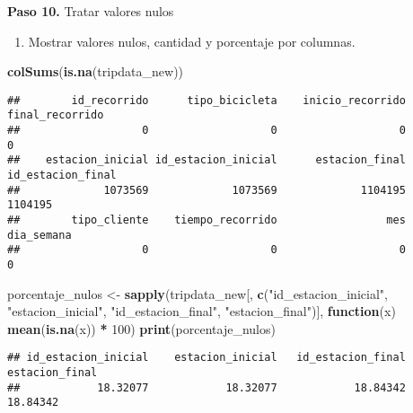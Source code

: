 \documentclass[
]{article}
\newenvironment{Shaded}{\begin{snugshade}}{\end{snugshade}}
\newcommand{\ControlFlowTok}[1]{\textcolor[rgb]{0.13,0.29,0.53}{\textbf{#1}}}
\newcommand{\DecValTok}[1]{\textcolor[rgb]{0.00,0.00,0.81}{#1}}
\newcommand{\FunctionTok}[1]{\textcolor[rgb]{0.13,0.29,0.53}{\textbf{#1}}}
\newcommand{\NormalTok}[1]{#1}
\newcommand{\OtherTok}[1]{\textcolor[rgb]{0.56,0.35,0.01}{#1}}
\newcommand{\SpecialCharTok}[1]{\textcolor[rgb]{0.81,0.36,0.00}{\textbf{#1}}}
\newcommand{\StringTok}[1]{\textcolor[rgb]{0.31,0.60,0.02}{#1}}
\providecommand{\tightlist}{%
  \setlength{\itemsep}{0pt}\setlength{\parskip}{0pt}}
\begin{document}
\subsubsection{}\label{sec-valores-nulos}

\hfill\break
\textbf{Paso 10.} Tratar valores nulos

\begin{enumerate}
\def\labelenumi{\arabic{enumi}.}
\tightlist
\item
  Mostrar valores nulos, cantidad y porcentaje por columnas.
\end{enumerate}

\begin{Shaded}
\begin{Highlighting}[]
    \FunctionTok{colSums}\NormalTok{(}\FunctionTok{is.na}\NormalTok{(tripdata\_new))}
\end{Highlighting}
\end{Shaded}

\begin{verbatim}
##        id_recorrido      tipo_bicicleta    inicio_recorrido     final_recorrido 
##                   0                   0                   0                   0 
##    estacion_inicial id_estacion_inicial      estacion_final   id_estacion_final 
##             1073569             1073569             1104195             1104195 
##        tipo_cliente    tiempo_recorrido                 mes          dia_semana 
##                   0                   0                   0                   0
\end{verbatim}

\begin{Shaded}
\begin{Highlighting}[]
\NormalTok{    porcentaje\_nulos }\OtherTok{\textless{}{-}} \FunctionTok{sapply}\NormalTok{(tripdata\_new[, }\FunctionTok{c}\NormalTok{(}\StringTok{"id\_estacion\_inicial"}\NormalTok{, }\StringTok{"estacion\_inicial"}\NormalTok{, }\StringTok{"id\_estacion\_final"}\NormalTok{, }\StringTok{"estacion\_final"}\NormalTok{)], }\ControlFlowTok{function}\NormalTok{(x) }\FunctionTok{mean}\NormalTok{(}\FunctionTok{is.na}\NormalTok{(x)) }\SpecialCharTok{*} \DecValTok{100}\NormalTok{)}
    \FunctionTok{print}\NormalTok{(porcentaje\_nulos)}
\end{Highlighting}
\end{Shaded}

\begin{verbatim}
## id_estacion_inicial    estacion_inicial   id_estacion_final      estacion_final 
##            18.32077            18.32077            18.84342            18.84342
\end{verbatim}
\end{document}

